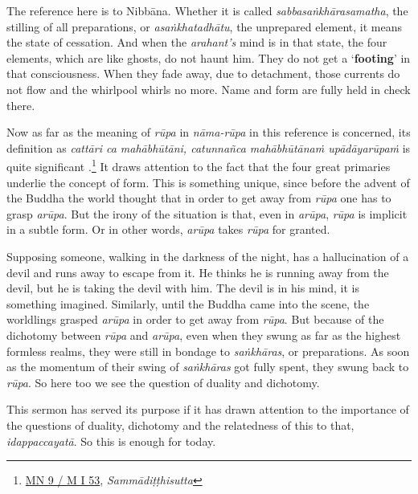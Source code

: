 The reference here is to Nibbāna. Whether it is called \emph{sabbasaṅkhārasamatha}, the stilling of all preparations, or \emph{asaṅkhatadhātu}, the unprepared element, it means the state of cessation. And when the \emph{arahant's} mind is in that state, the four elements, which are like ghosts, do not haunt him. They do not get a `\textbf{footing}' in that consciousness. When they fade away, due to detachment, those currents do not flow and the whirlpool whirls no more. Name and form are fully held in check there.

Now as far as the meaning of \emph{rūpa} in \emph{nāma-rūpa} in this reference is concerned, its definition as \emph{cattāri ca mahābhūtāni, catunnañca mahābhūtānaṁ upādāyarūpaṁ} is quite significant .\footnote{\href{https://suttacentral.net/mn9/pli/ms}{MN 9 / M I 53}, \emph{Sammādiṭṭhisutta}} It draws attention to the fact that the four great primaries underlie the concept of form. This is something unique, since before the advent of the Buddha the world thought that in order to get away from \emph{rūpa} one has to grasp \emph{arūpa}. But the irony of the situation is that, even in \emph{arūpa}, \emph{rūpa} is implicit in a subtle form. Or in other words, \emph{arūpa} takes \emph{rūpa} for granted.

Supposing someone, walking in the darkness of the night, has a hallucination of a devil and runs away to escape from it. He thinks he is running away from the devil, but he is taking the devil with him. The devil is in his mind, it is something imagined. Similarly, until the Buddha came into the scene, the worldlings grasped \emph{arūpa} in order to get away from \emph{rūpa}. But because of the dichotomy between \emph{rūpa} and \emph{arūpa}, even when they swung as far as the highest formless realms, they were still in bondage to \emph{saṅkhāras}, or preparations. As soon as the momentum of their swing of \emph{saṅkhāras} got fully spent, they swung back to \emph{rūpa}. So here too we see the question of duality and dichotomy.

This sermon has served its purpose if it has drawn attention to the importance of the questions of duality, dichotomy and the relatedness of this to that, \emph{idappaccayatā}. So this is enough for today.
